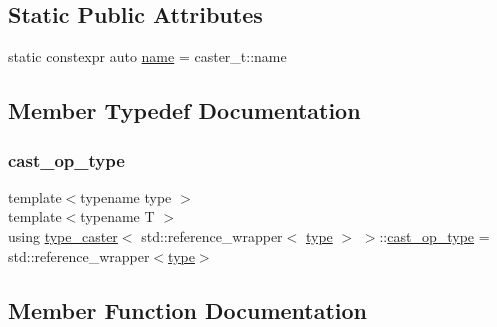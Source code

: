 \subsection*{Static Public Attributes}
\begin{DoxyCompactItemize}
\item 
static constexpr auto \mbox{\hyperlink{classtype__caster_3_01std_1_1reference__wrapper_3_01type_01_4_01_4_a4022644d041c739e86d54af79bcfe548}{name}} = caster\+\_\+t\+::name
\end{DoxyCompactItemize}


\subsection{Member Typedef Documentation}
\mbox{\label{classtype__caster_3_01std_1_1reference__wrapper_3_01type_01_4_01_4_a6685ce2cf35603c77c4830453c900be5}} 
\subsubsection{\texorpdfstring{cast\_op\_type}{cast\_op\_type}}
{\footnotesize\ttfamily template$<$typename type $>$ \\
template$<$typename T $>$ \\
using \mbox{\hyperlink{classtype__caster}{type\+\_\+caster}}$<$ std\+::reference\+\_\+wrapper$<$ \mbox{\hyperlink{_s_d_l__opengl_8h_ad5ddf6fca7b585646515660e810e0188}{type}} $>$ $>$\+::\mbox{\hyperlink{classtype__caster_3_01std_1_1reference__wrapper_3_01type_01_4_01_4_a6685ce2cf35603c77c4830453c900be5}{cast\+\_\+op\+\_\+type}} =  std\+::reference\+\_\+wrapper$<$\mbox{\hyperlink{_s_d_l__opengl_8h_ad5ddf6fca7b585646515660e810e0188}{type}}$>$}



\subsection{Member Function Documentation}
\mbox{\label{classtype__caster_3_01std_1_1reference__wrapper_3_01type_01_4_01_4_a345e25ad868cc4b8659dbe1c7f3b1153}} 
